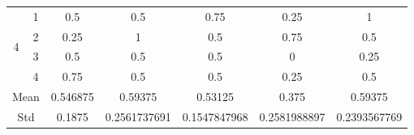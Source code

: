 \documentclass[draft,dvipsnames]{drexel-thesis}
\begin{document}
\begin{thesis}
\begin{table}[!t]
\begin{tabular}{|c|c|c|c|c|c|c|}
\multirow{4}{*}{4}    & 1                   & 0.5      & 0.5          & 0.75         & 0.25         & 1            \\ \cline{2-7}
                      & 2                   & 0.25     & 1            & 0.5          & 0.75         & 0.5          \\ \cline{2-7}
                      & 3                   & 0.5      & 0.5          & 0.5          & 0            & 0.25         \\ \cline{2-7}
                      & 4                   & 0.75     & 0.5          & 0.5          & 0.25         & 0.5          \\ \hline
\multicolumn{2}{|c|}{Mean}                  & 0.546875 & 0.59375      & 0.53125      & 0.375        & 0.59375      \\ \hline
\multicolumn{2}{|c|}{Std}                   & 0.1875   & 0.2561737691 & 0.1547847968 & 0.2581988897 & 0.2393567769 \\ \hline
\end{tabular}
\end{table}


\end{thesis}
\end{document}
